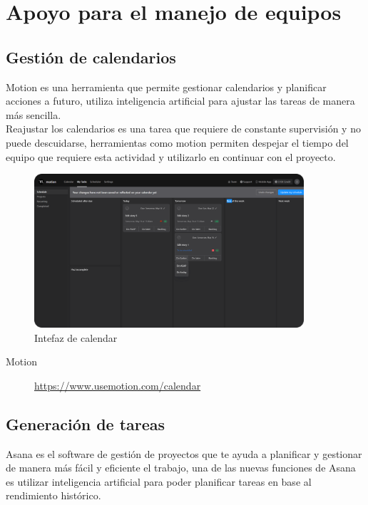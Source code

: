 \documentclass[11pt]{article}
\begin{document}
\pagebreak

\section{Apoyo para el manejo de equipos}
\label{sec:org153beb9}
\subsection{Gestión de calendarios}
\label{sec:orgf297b1a}
Motion es una herramienta que permite gestionar calendarios y
planificar acciones a futuro, utiliza inteligencia artificial para
ajustar las tareas de manera más sencilla. \\

Reajustar los calendarios es una tarea que requiere de constante
supervisión y no puede descuidarse, herramientas como motion permiten
despejar el tiempo del equipo que requiere esta actividad y utilizarlo
en continuar con el proyecto.

\begin{figure}[htbp]
\centering
\includegraphics[width=10cm]{img/motion.png}
\caption{Intefaz de calendar}
\end{figure}

\begin{description}
\item[{Motion}] \url{https://www.usemotion.com/calendar}
\end{description}

\pagebreak

\subsection{Generación de tareas}
\label{sec:org1d6eb96}
Asana es el software de gestión de proyectos que te ayuda a planificar
y gestionar de manera más fácil y eficiente el trabajo, una de las
nuevas funciones de Asana es utilizar inteligencia artificial para
poder planificar tareas en base al rendimiento histórico.
\end{document}
